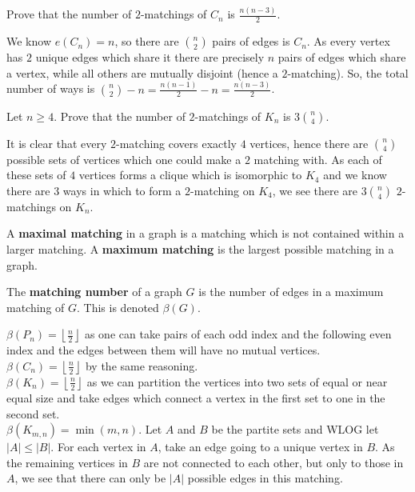 \begin{problem}
	Prove that the number of $2$-matchings of $C_{n}$ is $\frac{n\left( n-3 \right) }{2}$.
\end{problem}
\begin{solution}
	We know $e \left( C_{n} \right)= n $, so there are $\binom{n}{2}$ pairs of edges is $C_{n}$. As every vertex has $2$ unique edges which share it there are precisely $n$ pairs of edges which share a vertex, while all others are mutually disjoint (hence a $2$-matching). So, the total number of ways is $\binom{n}{2}- n =  \frac{n\left( n-1 \right) }{2} - n = \frac{n \left( n-3 \right) }{2}$.
\end{solution}
\begin{problem}
	Let $n\ge 4$. Prove that the number of $2$-matchings of $K_{n}$ is $3\binom{n}{4}$.
\end{problem}
\begin{solution}
	It is clear that every $2$-matching covers exactly $4$ vertices, hence there are $\binom{n}{4}$ possible sets of vertices which one could make a $2$ matching with. As each of these sets of $4$ vertices forms a clique which is isomorphic to $K_4$ and we know there are $3$ ways in which to form a $2$-matching on $K_4$, we see there are $3\binom{n}{4}$ $2$-matchings on $K_{n}$.
\end{solution}
\begin{definition}
	A \textbf{maximal matching} in a graph is a matching which is not contained within a larger matching. A \textbf{maximum matching} is the largest possible matching in a graph.
\end{definition}
\begin{definition}
	The \textbf{matching number} of a graph $G$ is the number of edges in a maximum matching of $G$. This is denoted $\beta \left( G \right) $.
\end{definition}
\begin{problem}
	$\beta \left( P_{n} \right) = \left\lfloor \frac{n}{2} \right\rfloor$ as one can take pairs of each odd index and the following even index and the edges between them will have no mutual vertices.\\
	$\beta \left( C_{n} \right) = \left\lfloor \frac{n}{2} \right\rfloor $ by the same reasoning.\\
	$\beta \left( K_{n} \right) = \left\lfloor \frac{n}{2} \right\rfloor$ as we can partition the vertices into two sets of equal or near equal size and take edges which connect a vertex in the first set to one in the second set.\\
	$\beta \left( K_{m, n} \right) = \min \left( m, n \right) $. Let  $A$ and $B$ be the partite sets and WLOG let $\left| A \right| \le \left| B \right| $. For each vertex in $A$, take an edge going to a unique vertex in $B$. As the remaining vertices in $B$ are not connected to each other, but only to those in $A$, we see that there can only be $\left| A \right|$ possible edges in this matching.
\end{problem}
